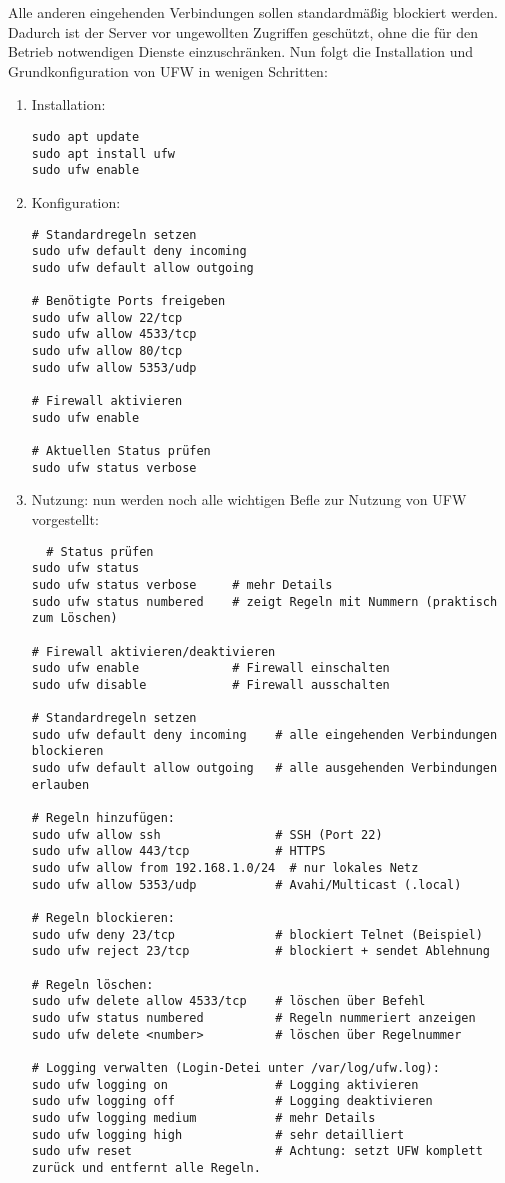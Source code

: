 \documentclass[12pt,a4paper]{report}
\begin{document}
  Alle anderen eingehenden Verbindungen sollen standardmäßig blockiert werden. 
  Dadurch ist der Server vor ungewollten Zugriffen geschützt, ohne die für den Betrieb notwendigen Dienste einzuschränken. 
  Nun folgt die Installation und Grundkonfiguration von \ac{UFW} in wenigen Schritten:

  \begin{enumerate}
    \item Installation:
    \begin{verbatim}
sudo apt update
sudo apt install ufw
sudo ufw enable
    \end{verbatim}

    \item Konfiguration:
    \begin{verbatim}
# Standardregeln setzen
sudo ufw default deny incoming
sudo ufw default allow outgoing

# Benötigte Ports freigeben
sudo ufw allow 22/tcp
sudo ufw allow 4533/tcp
sudo ufw allow 80/tcp
sudo ufw allow 5353/udp

# Firewall aktivieren
sudo ufw enable

# Aktuellen Status prüfen
sudo ufw status verbose
    \end{verbatim}

    \item Nutzung:
    nun werden noch alle wichtigen Befle zur Nutzung von \ac{UFW} vorgestellt:
    \begin{verbatim}
  # Status prüfen
sudo ufw status
sudo ufw status verbose     # mehr Details
sudo ufw status numbered    # zeigt Regeln mit Nummern (praktisch zum Löschen)

# Firewall aktivieren/deaktivieren
sudo ufw enable             # Firewall einschalten
sudo ufw disable            # Firewall ausschalten

# Standardregeln setzen
sudo ufw default deny incoming    # alle eingehenden Verbindungen blockieren
sudo ufw default allow outgoing   # alle ausgehenden Verbindungen erlauben

# Regeln hinzufügen:
sudo ufw allow ssh                # SSH (Port 22)
sudo ufw allow 443/tcp            # HTTPS
sudo ufw allow from 192.168.1.0/24  # nur lokales Netz
sudo ufw allow 5353/udp           # Avahi/Multicast (.local)

# Regeln blockieren:
sudo ufw deny 23/tcp              # blockiert Telnet (Beispiel)
sudo ufw reject 23/tcp            # blockiert + sendet Ablehnung

# Regeln löschen:
sudo ufw delete allow 4533/tcp    # löschen über Befehl
sudo ufw status numbered          # Regeln nummeriert anzeigen
sudo ufw delete <number>          # löschen über Regelnummer

# Logging verwalten (Login-Detei unter /var/log/ufw.log):
sudo ufw logging on               # Logging aktivieren
sudo ufw logging off              # Logging deaktivieren
sudo ufw logging medium           # mehr Details
sudo ufw logging high             # sehr detailliert
sudo ufw reset                    # Achtung: setzt UFW komplett zurück und entfernt alle Regeln.
    \end{verbatim}
  \end{enumerate}
\end{document}
